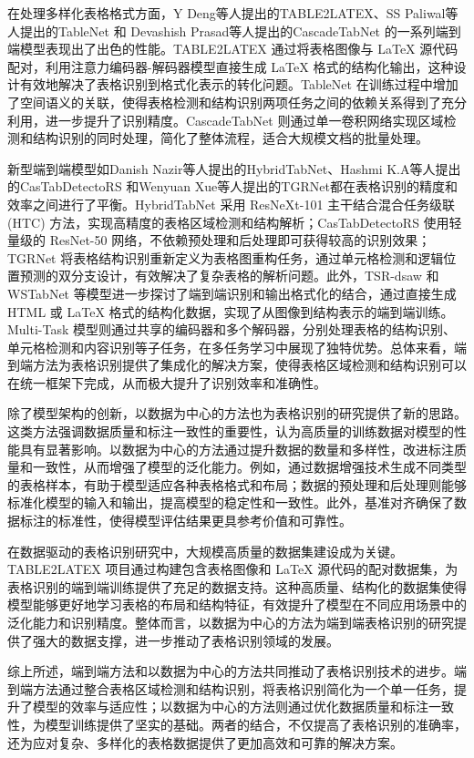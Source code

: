 \documentclass[UTF8,12pt, AutoFakeBold,fontset = founder]{ctexart}
\begin{document}
在处理多样化表格格式方面，Y Deng\cite{b2}等人提出的TABLE2LATEX、SS Paliwal\cite{b2}等人提出的TableNet 和 Devashish Prasad\cite{b2}等人提出的CascadeTabNet 的一系列端到端模型表现出了出色的性能。TABLE2LATEX 通过将表格图像与 LaTeX 源代码配对，利用注意力编码器-解码器模型直接生成 LaTeX 格式的结构化输出，这种设计有效地解决了表格识别到格式化表示的转化问题。TableNet 在训练过程中增加了空间语义的关联，使得表格检测和结构识别两项任务之间的依赖关系得到了充分利用，进一步提升了识别精度。CascadeTabNet 则通过单一卷积网络实现区域检测和结构识别的同时处理，简化了整体流程，适合大规模文档的批量处理。

新型端到端模型如Danish Nazir\cite{b2}等人提出的HybridTabNet、Hashmi K.A\cite{b2}等人提出的CasTabDetectoRS 和Wenyuan Xue\cite{b2}等人提出的TGRNet都在表格识别的精度和效率之间进行了平衡。HybridTabNet 采用 ResNeXt-101 主干结合混合任务级联 (HTC) 方法，实现高精度的表格区域检测和结构解析；CasTabDetectoRS 使用轻量级的 ResNet-50 网络，不依赖预处理和后处理即可获得较高的识别效果；TGRNet 将表格结构识别重新定义为表格图重构任务，通过单元格检测和逻辑位置预测的双分支设计，有效解决了复杂表格的解析问题。此外，TSR-dsaw 和 WSTabNet 等模型进一步探讨了端到端识别和输出格式化的结合，通过直接生成 HTML 或 LaTeX 格式的结构化数据，实现了从图像到结构表示的端到端训练。Multi-Task 模型则通过共享的编码器和多个解码器，分别处理表格的结构识别、单元格检测和内容识别等子任务，在多任务学习中展现了独特优势。总体来看，端到端方法为表格识别提供了集成化的解决方案，使得表格区域检测和结构识别可以在统一框架下完成，从而极大提升了识别效率和准确性。

除了模型架构的创新，以数据为中心的方法也为表格识别的研究提供了新的思路。这类方法强调数据质量和标注一致性的重要性，认为高质量的训练数据对模型的性能具有显著影响。以数据为中心的方法通过提升数据的数量和多样性，改进标注质量和一致性，从而增强了模型的泛化能力。例如，通过数据增强技术生成不同类型的表格样本，有助于模型适应各种表格格式和布局；数据的预处理和后处理则能够标准化模型的输入和输出，提高模型的稳定性和一致性。此外，基准对齐确保了数据标注的标准性，使得模型评估结果更具参考价值和可靠性。

在数据驱动的表格识别研究中，大规模高质量的数据集建设成为关键。TABLE2LATEX 项目通过构建包含表格图像和 LaTeX 源代码的配对数据集，为表格识别的端到端训练提供了充足的数据支持。这种高质量、结构化的数据集使得模型能够更好地学习表格的布局和结构特征，有效提升了模型在不同应用场景中的泛化能力和识别精度。整体而言，以数据为中心的方法为端到端表格识别的研究提供了强大的数据支撑，进一步推动了表格识别领域的发展。

综上所述，端到端方法和以数据为中心的方法共同推动了表格识别技术的进步。端到端方法通过整合表格区域检测和结构识别，将表格识别简化为一个单一任务，提升了模型的效率与适应性；以数据为中心的方法则通过优化数据质量和标注一致性，为模型训练提供了坚实的基础。两者的结合，不仅提高了表格识别的准确率，还为应对复杂、多样化的表格数据提供了更加高效和可靠的解决方案。
\end{document}

